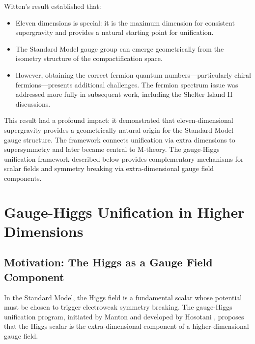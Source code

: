 \begin{remark}
Witten's result established that:
\begin{itemize}
\item Eleven dimensions is special: it is the maximum dimension for consistent
supergravity and provides a natural starting point for unification.
\item The Standard Model gauge group can emerge geometrically from the isometry
structure of the compactification space.
\item However, obtaining the correct fermion quantum numbers---particularly
chiral fermions---presents additional challenges.  The fermion spectrum issue
was addressed more fully in subsequent work, including the Shelter Island II
discussions.
\end{itemize}
\end{remark}

This result had a profound impact: it demonstrated that eleven-dimensional
supergravity provides a geometrically natural origin for the Standard Model gauge
structure.  The framework connects unification via extra dimensions to
supersymmetry and later became central to M-theory.  The gauge-Higgs unification
framework described below provides complementary mechanisms for scalar fields and
symmetry breaking via extra-dimensional gauge field components.

\section{Gauge-Higgs Unification in Higher Dimensions}

\subsection{Motivation: The Higgs as a Gauge Field Component}

In the Standard Model, the Higgs field is a fundamental scalar whose potential
must be chosen to trigger electroweak symmetry breaking.  The gauge-Higgs
unification program, initiated by Manton \cite{Manton1979} and developed by
Hosotani \cite{Hosotani1983, Hosotani1989}, proposes that the Higgs scalar is
the extra-dimensional component of a higher-dimensional gauge field.

